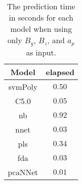 \begin{table}[!ht]
	\centering
	\begin{tabular}{|c|c|}
		\hline
		Model & elapsed \\ \hline
		svmPoly & $0.50$ \\ \hline
		C5.0 & $0.05$ \\ \hline
		nb & $0.92$ \\ \hline
		nnet & $0.03$ \\ \hline
		pls & $0.34$ \\ \hline
		fda & $0.03$ \\ \hline
		pcaNNet & $0.01$ \\ \hline
	\end{tabular}
	\caption{The prediction time in seconds for each model when using only $B_{y}$, $B_{z}$, and $a_{p}$ as input.}
	\label{tab:time:yzap:predict}
\end{table}
